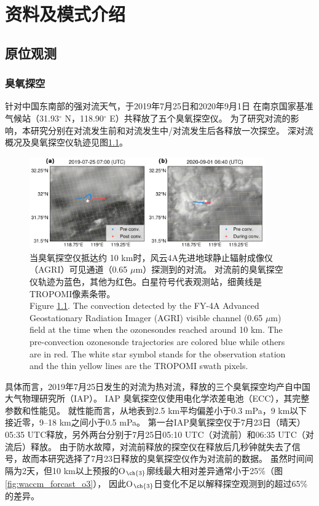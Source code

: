 
\chapter{资料及模式介绍}

\section{原位观测}

\subsection{臭氧探空}

针对中国东南部的强对流天气，于2019年7月25日和2020年9月1日
在南京国家基准气候站（31.93$^{\circ}$ N，118.90$^{\circ}$ E）共释放了五个臭氧探空仪。
为了研究对流的影响，本研究分别在对流发生前和对流发生中/对流发生后各释放一次探空。
深对流概况及臭氧探空仪轨迹见图\ref{fig:ozonesonde}。

\begin{figure}[H]
\centering
\includegraphics[width=0.9\textwidth]{./figures/ozonesonde.png}
\caption{当臭氧探空仪抵达约 10 km时，风云4A先进地球静止辐射成像仪（AGRI）可见通道（0.65 $\mu$m）探测到的对流。
对流前的臭氧探空仪轨迹为蓝色，其他为红色。白星符号代表观测站，细黄线是TROPOMI像素条带。\\
Figure \ref{fig:ozonesonde}. The convection detected by the FY-4A Advanced Geostationary Radiation Imager (AGRI)
visible channel (0.65 $\mu$m) field at the time when the ozonesondes reached around 10 km.
The pre-convection ozonesonde trajectories are colored blue while others are in red.
The white star symbol stands for the observation station and the thin yellow lines are the TROPOMI swath pixels.
}
\label{fig:ozonesonde}
\end{figure}


具体而言，2019年7月25日发生的对流为热对流，释放的三个臭氧探空均产自中国大气物理研究所（IAP）。
IAP 臭氧探空仪使用电化学浓差电池（ECC），其完整参数和性能见\citet{Zhang.2014}。
就性能而言，从地表到2.5 km平均偏差小于0.3 mPa，9 km以下接近零，9--18 km之间小于0.5 mPa。
第一台IAP臭氧探空仪于7月23日（晴天）05:35 UTC释放，另外两台分别于7月25日05:10 UTC（对流前）和06:35 UTC（对流后）释放。
由于防水故障，对流前释放的探空仪在释放后几秒钟就失去了信号，故而本研究选择了7月23日释放的臭氧探空仪作为对流前的数据。
虽然时间间隔为2天，但10 km以上预报的O$_{\ch{3}}$廓线最大相对差异通常小于25\%（图\ref{fig:waccm_forcast_o3}），
因此O$_{\ch{3}}$日变化不足以解释探空观测到的超过65\%的差异。

